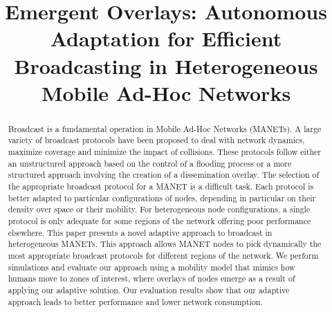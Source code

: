 \documentclass[10pt, conference, letterpaper]{IEEEtran}
\begin{document}
\title{Emergent Overlays: Autonomous Adaptation for Efficient Broadcasting in Heterogeneous Mobile Ad-Hoc Networks}

\author{\IEEEauthorblockN{}
\IEEEauthorblockA{}
}

\maketitle

\begin{abstract}
Broadcast is a fundamental operation in Mobile Ad-Hoc Networks (MANETs).
A large variety of broadcast protocols have been proposed to deal with network dynamics, maximize coverage and minimize the impact of collisions.
These protocols follow either an unstructured approach based on the control of a flooding process or a more structured approach involving the creation of a dissemination overlay.
The selection of the appropriate broadcast protocol for a MANET is a difficult task.
Each protocol is better adapted to particular configurations of nodes, depending in particular on their density over space or their mobility.
For heterogeneous node configurations, a single protocol is only adequate for some regions of the network offering poor performance elsewhere.
This paper presents a novel adaptive approach to broadcast in heterogeneous MANETs.
This approach allows MANET nodes to pick dynamically the most appropriate broadcast protocols for different regions of the network.
We perform simulations and evaluate our approach using a mobility model that mimics how humans move to zones of interest, where overlays of nodes emerge as a result of applying our adaptive solution.
%
Our evaluation results show that our adaptive approach leads to better performance and lower network consumption.
\end{abstract}

\IEEEpeerreviewmaketitle







\end{document}
